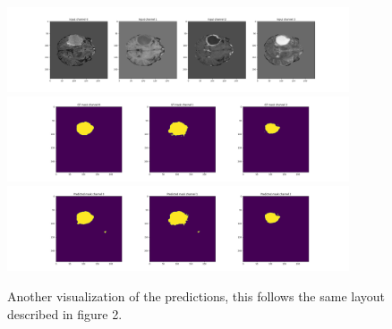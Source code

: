 \documentclass[onecolumn]{article}
\begin{document}
\begin{figure}[!ht]
	\centering
	\includegraphics[width=0.9\textwidth]{imgs/inputs2.png}
	\includegraphics[width=0.9\textwidth]{imgs/gt2.png}
	\includegraphics[width=0.9\textwidth]{imgs/pred2.png}
	\caption{Another visualization of the predictions, this follows the same layout described in figure 2.}
	\label{fig:}
\end{figure}

\newpage




	
\end{document}
